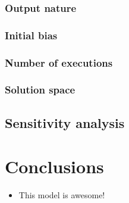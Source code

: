 \documentclass{wscpaperproc}
\begin{document}
\subsubsection{Output nature}
\subsubsection{Initial bias}
\subsubsection{Number of executions}
\subsubsection{Solution space}

\subsection{Sensitivity analysis}

\section{Conclusions}

\begin{itemize}
    \item This model is awesome! \cite{slurm}
\end{itemize}



\end{document}

